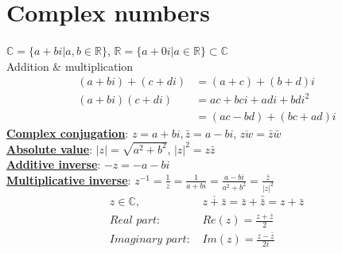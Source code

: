 \documentclass[11pt]{elegantbook}
\begin{document}
\chapter{Complex numbers}
$\mathbb{C}=\{a+bi | a,b\in\mathbb{R}\}$, $\mathbb{R}=\{a+0i | a\in\mathbb{R}\}\subset \mathbb{C}$\\
Addition $\&$ multiplication
\begin{equation}
    \begin{aligned}
        (a + bi) + (c + di) &= (a + c) + (b + d)i\\
        (a + bi )(c + di) &= ac + bci + adi + bdi^2\\
        &= (ac-bd) + (bc + ad)i
    \end{aligned}
    \nonumber
\end{equation}
\textbf{\underline{Complex conjugation}}: $z = a + bi , \bar{z} = a - bi$, $\overline{zw}=\bar{z}\bar{w}$\\
\textbf{\underline{Absolute value}}: $|z| = \sqrt{a^2+b^2}$, $|z|^2=z\bar{z}$\\
\textbf{\underline{Additive inverse}}: $-z=-a-bi$\\
\textbf{\underline{Multiplicative inverse}}: $z^{-1}=\frac{1}{z}=\frac{1}{a+bi}=\frac{a-bi}{a^2+b^2}=\frac{\bar{z}}{|z|^2}$\\
\begin{equation}
    \begin{aligned}
        z\in\mathbb{C}, &\overline{z+\bar{z}}=\bar{z}+\bar{\bar{z}}=z+\bar{z}\\
        \textit{Real part: }&Re(z)=\frac{z+\bar{z}}{2}\\
        \textit{Imaginary part: }&Im(z)=\frac{z-\bar{z}}{2i}\\
    \end{aligned}
    \nonumber
\end{equation}
\end{document}
